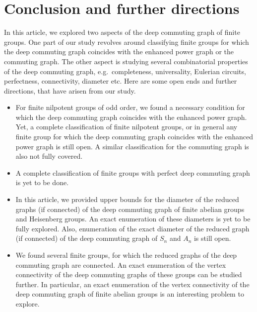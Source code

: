 \documentclass[12pt,a4paper]{article}
\begin{document}
\section{Conclusion and further directions}
In this article, we explored two aspects of the deep commuting graph of finite groups. One part of our study revolves around classifying finite groups for which the deep commuting graph coincides with the enhanced power graph or the commuting graph. The other aspect is studying several combinatorial properties of the deep commuting graph, e.g.~completeness, universality, Eulerian circuits, perfectness, connectivity, diameter etc. Here are some open ends and further directions, that have arisen from our study.
\begin{itemize}
    \item For finite nilpotent groups of odd order, we found a necessary condition for which the deep commuting graph coincides with the enhanced power graph. Yet, a complete classification of finite nilpotent groups, or in general any finite group for which the deep commuting graph coincides with the enhanced power graph is still open. A similar classification for the commuting graph is also not fully covered. 

    \item A complete classification of finite groups with perfect deep commuting graph is yet to be done.

    \item In this article, we provided upper bounds for the diameter of the reduced graphs (if connected) of the deep commuting graph of finite abelian groups and Heisenberg groups. An exact enumeration of these diameters is yet to be fully explored. Also, enumeration of the exact diameter of the reduced graph (if connected) of the deep commuting graph of $S_n$ and $A_n$ is still open.

    \item We found several finite groups, for which the reduced graphs of the deep commuting graph are connected. An exact enumeration of the vertex connectivity of the deep commuting graphs of these groups can be studied further. In particular, an exact enumeration of the vertex connectivity of the deep commuting graph of finite abelian groups is an interesting problem to explore. 
\end{itemize}
\end{document}
